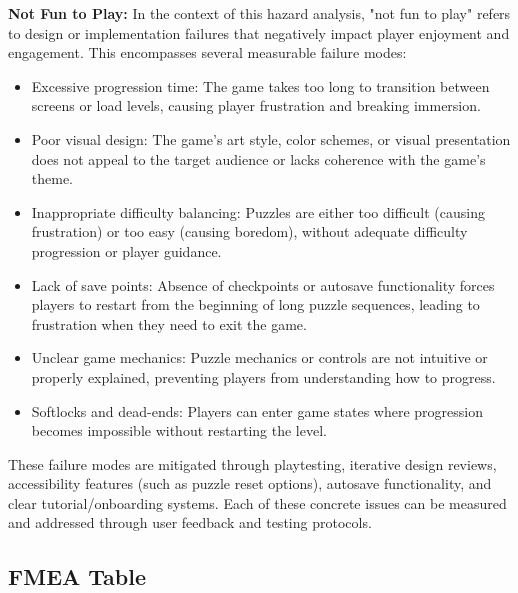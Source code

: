 \documentclass{article}
\begin{document}
\textbf{Not Fun to Play:} In the context of this hazard analysis, "not fun to play" refers to design or implementation failures that negatively impact player enjoyment and engagement. This encompasses several measurable failure modes:
\begin{itemize}
\item{Excessive progression time: The game takes too long to transition between screens or load levels, causing player frustration and breaking immersion.}
\item{Poor visual design: The game's art style, color schemes, or visual presentation does not appeal to the target audience or lacks coherence with the game's theme.}
\item{Inappropriate difficulty balancing: Puzzles are either too difficult (causing frustration) or too easy (causing boredom), without adequate difficulty progression or player guidance.}
\item{Lack of save points: Absence of checkpoints or autosave functionality forces players to restart from the beginning of long puzzle sequences, leading to frustration when they need to exit the game.}
\item{Unclear game mechanics: Puzzle mechanics or controls are not intuitive or properly explained, preventing players from understanding how to progress.}
\item{Softlocks and dead-ends: Players can enter game states where progression becomes impossible without restarting the level.}
\end{itemize}

These failure modes are mitigated through playtesting, iterative design reviews, accessibility features (such as puzzle reset options), autosave functionality, and clear tutorial/onboarding systems. Each of these concrete issues can be measured and addressed through user feedback and testing protocols.

\subsection{FMEA Table}
\end{document}

